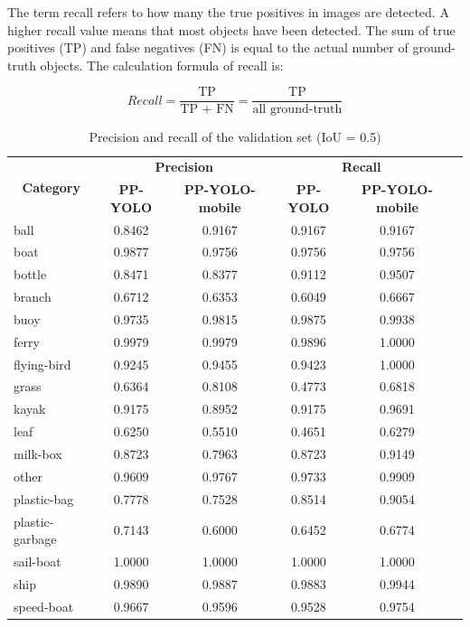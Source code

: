 \documentclass[sensors,article,submit,moreauthors,pdftex]{Definitions/mdpi}
\begin{document}
\begin{paracol}{2}
The term recall refers to how many the true positives in images are detected. A higher recall value means that most objects have been detected. The sum of true positives (TP) and false negatives (FN) is equal to the actual number of ground-truth objects. The calculation formula of recall is:

\begin{equation} 
Recall = \frac{\text{TP}}{\text{TP + FN} } = \frac{\text{TP}}{\text{all\ ground-truth} } 
\end{equation}

\begin{table}[htbp]
\centering
\caption{Precision and recall of the validation set (IoU = 0.5)}
\begin{tabular}{lccccc} 
\toprule

\multicolumn{1}{c}{\multirow{2}{*}{\textbf{Category}}} & \multicolumn{2}{c}{\textbf{Precision}}       & \multicolumn{2}{c}{\textbf{Recall}} \\
\cmidrule(l){2-5} 
\multicolumn{1}{c}{} & \textbf{PP-YOLO} & \textbf{PP-YOLO-mobile} & \textbf{PP-YOLO} & \textbf{PP-YOLO-mobile} \\

\midrule
ball& 0.8462& 0.9167& 0.9167& 0.9167 \\
boat& 0.9877& 0.9756& 0.9756& 0.9756 \\
bottle& 0.8471& 0.8377& 0.9112& 0.9507 \\
branch& 0.6712& 0.6353& 0.6049& 0.6667 \\
buoy& 0.9735& 0.9815& 0.9875& 0.9938 \\
ferry& 0.9979& 0.9979& 0.9896& 1.0000 \\
flying-bird& 0.9245&0.9455 & 0.9423& 1.0000 \\
grass& 0.6364& 0.8108& 0.4773& 0.6818 \\
kayak& 0.9175& 0.8952& 0.9175& 0.9691 \\
leaf& 0.6250& 0.5510& 0.4651& 0.6279 \\
milk-box& 0.8723& 0.7963& 0.8723& 0.9149 \\
other& 0.9609& 0.9767& 0.9733& 0.9909 \\
plastic-bag& 0.7778& 0.7528& 0.8514& 0.9054 \\
plastic-garbage& 0.7143&0.6000 & 0.6452& 0.6774 \\
sail-boat& 1.0000& 1.0000& 1.0000& 1.0000 \\
ship& 0.9890& 0.9887& 0.9883& 0.9944 \\
speed-boat& 0.9667& 0.9596& 0.9528& 0.9754 \\


\end{tabular}
\end{table}
\end{paracol}
\end{document}
